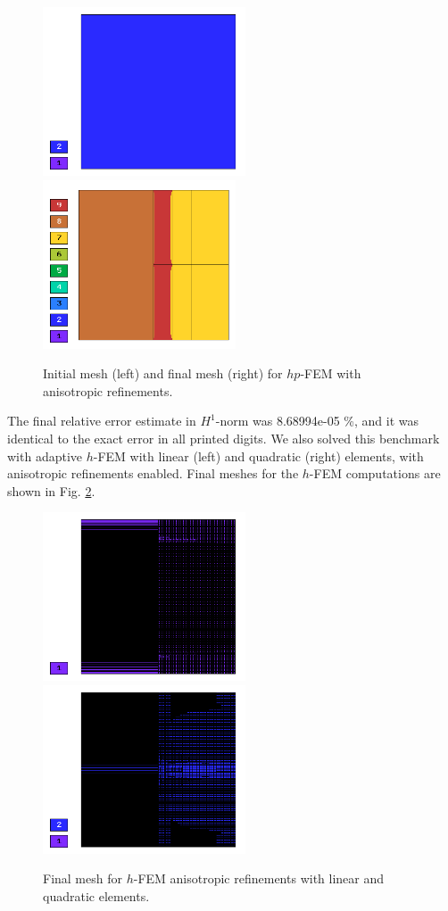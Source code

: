 \begin{figure}[!ht]
\centering
\includegraphics[height=5cm]{nist/nist-10/mesh_hp_aniso_init.png}\ \
\includegraphics[height=5cm]{nist/nist-10/mesh_hp_aniso.png}
\vspace{-2mm}
\caption{Initial mesh (left) and final mesh (right) for $hp$-FEM with anisotropic refinements.}
\label{fig:nist-10-hp-aniso}
\end{figure}

The final relative error estimate in $H^1$-norm was 8.68994e-05 \%,
and it was identical to the exact error in all printed digits.
We also solved this benchmark with adaptive $h$-FEM
with linear (left) and quadratic (right)
elements, with anisotropic refinements enabled.
Final meshes for the $h$-FEM computations are shown
in Fig. \ref{fig:nist-10-h-aniso}.

\begin{figure}[!ht]
\centering
\includegraphics[height=5cm]{nist/nist-10/mesh_h1_aniso.png}\ \
\includegraphics[height=5cm]{nist/nist-10/mesh_h2_aniso.png}
\vspace{-2mm}
\caption{Final mesh for $h$-FEM anisotropic refinements with linear and quadratic elements.}
\label{fig:nist-10-h-aniso}
\end{figure}

